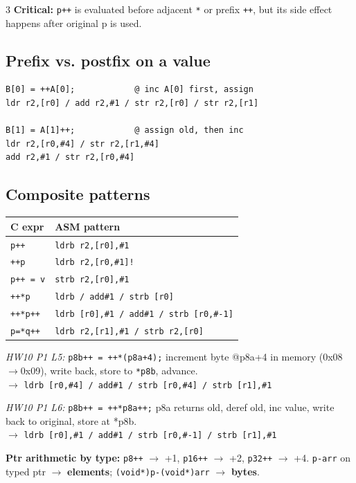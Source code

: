 \documentclass[8pt,landscape]{extarticle}
\newcommand{\asm}[1]{\texttt{\scriptsize #1}}
\newcommand{\cee}[1]{\texttt{\scriptsize #1}}
\begin{document}
\begin{multicols*}{3}
\textbf{Critical:} \cee{p++} is evaluated before adjacent \texttt{*} or prefix \texttt{++}, but its side effect happens after original p is used.

\subsection{Prefix vs. postfix on a value}
\begin{lstlisting}
B[0] = ++A[0];            @ inc A[0] first, assign
ldr r2,[r0] / add r2,#1 / str r2,[r0] / str r2,[r1]

B[1] = A[1]++;            @ assign old, then inc
ldr r2,[r0,#4] / str r2,[r1,#4]
add r2,#1 / str r2,[r0,#4]
\end{lstlisting}

\subsection{Composite patterns}
\begin{tabular}{@{}ll@{}}
\toprule
C expr & ASM pattern \\
\midrule
\cee{*p++}       & \asm{ldrb r2,[r0],\#1}  \\
\cee{*++p}       & \asm{ldrb r2,[r0,\#1]!} \\
\cee{*p++ = v}   & \asm{strb r2,[r0],\#1}  \\
\cee{++*p}       & \asm{ldrb / add\#1 / strb [r0]} \\
\cee{++*p++}     & \asm{ldrb [r0],\#1 / add\#1 / strb [r0,\#-1]} \\
\cee{*p=*q++}    & \asm{ldrb r2,[r1],\#1 / strb r2,[r0]} \\
\bottomrule
\end{tabular}

\textit{HW10 P1 L5:} \cee{*p8b++ = ++*(p8a+4);} increment byte @p8a+4 in memory (0x08$\to$0x09), write back, store to \texttt{*p8b}, advance.\\
$\to$ \asm{ldrb [r0,\#4] / add\#1 / strb [r0,\#4] / strb [r1],\#1}

\textit{HW10 P1 L6:} \cee{*p8b++ = ++*p8a++;} p8a returns old, deref old, inc value, write back to original, store at *p8b.\\
$\to$ \asm{ldrb [r0],\#1 / add\#1 / strb [r0,\#-1] / strb [r1],\#1}

\textbf{Ptr arithmetic by type:}
\texttt{p8++} $\to$ +1,\; \texttt{p16++} $\to$ +2,\; \texttt{p32++} $\to$ +4.\;
\cee{p-arr} on typed ptr $\to$ \textbf{elements}; \cee{(void*)p-(void*)arr} $\to$ \textbf{bytes}.


\end{multicols*}
\end{document}

